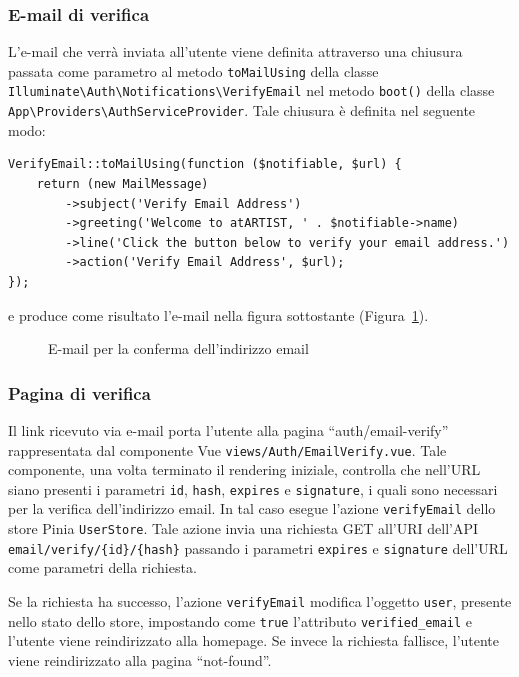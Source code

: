 \subsubsection{E-mail di verifica}
L'e-mail che verr\`a inviata all'utente viene definita attraverso una chiusura passata come parametro al metodo \verb|toMailUsing| della classe \verb|Illuminate\Auth\Notifications\VerifyEmail| nel metodo \verb|boot()| della classe \verb|App\Providers\AuthServiceProvider|. Tale chiusura \`e definita nel seguente modo:
\begin{lstlisting}[caption={E-mail di verifica}, label={lst:route_registration}]
VerifyEmail::toMailUsing(function ($notifiable, $url) {
	return (new MailMessage)
		->subject('Verify Email Address')
		->greeting('Welcome to atARTIST, ' . $notifiable->name)
		->line('Click the button below to verify your email address.')
		->action('Verify Email Address', $url);
});
\end{lstlisting}
e produce come risultato l'e-mail nella figura sottostante (Figura~\ref{fig:email_di_verifica}).
\begin{figure}[htbp]
	\centering
	\fboxsep=0.5pt
	\fboxrule=0.5pt
	\caption{E-mail per la conferma dell'indirizzo email}
	\label{fig:email_di_verifica}
\end{figure}


\subsubsection{Pagina di verifica}
Il link ricevuto via e-mail porta l'utente alla pagina ``auth/email-verify'' rappresentata dal componente Vue \verb|views/Auth/EmailVerify.vue|. Tale componente, una volta terminato il rendering iniziale, controlla che nell'URL siano presenti i parametri \verb|id|, \verb|hash|, \verb|expires| e \verb|signature|, i quali sono necessari per la verifica dell'indirizzo email. In tal caso esegue l'azione \verb|verifyEmail| dello store Pinia \verb|UserStore|. Tale azione invia una richiesta GET all'URI dell'API \verb|email/verify/{id}/{hash}| passando i parametri \verb|expires| e \verb|signature| dell'URL come parametri della richiesta.

Se la richiesta ha successo, l'azione \verb|verifyEmail| modifica l'oggetto \verb|user|, presente nello stato dello store, impostando come \verb|true| l'attributo \verb|verified_email| e l'utente viene reindirizzato alla homepage. Se invece la richiesta fallisce, l'utente viene reindirizzato alla pagina ``not-found''.
